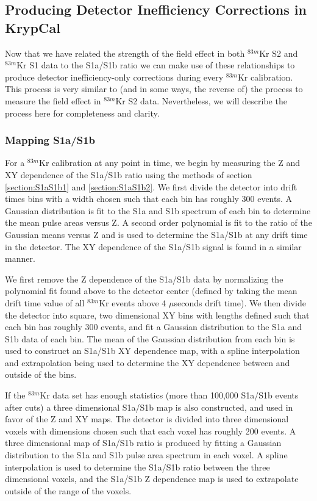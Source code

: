 \subsection{Producing Detector Inefficiency Corrections in KrypCal} \label{KrypCalCode}

Now that we have related the strength of the field effect in both $^{83m}$Kr S2 and $^{83m}$Kr S1 data to the S1a/S1b ratio we can make use of these relationships to produce detector inefficiency-only corrections during every $^{83m}$Kr calibration.  This process is very similar to (and in some ways, the reverse of) the process to measure the field effect in $^{83m}$Kr S2 data. Nevertheless, we will describe the process here for completeness and clarity.

\subsubsection{Mapping S1a/S1b}

For a $^{83m}$Kr calibration at any point in time, we begin by measuring the Z and XY dependence of the S1a/S1b ratio using the methods of section  \ref{section:S1aS1b1} and  \ref{section:S1aS1b2}.  We first divide the detector into drift times bins with a width chosen such that each bin has roughly 300 events.   A Gaussian distribution is fit to the S1a and S1b spectrum of each bin to determine the mean pulse areas versus Z.  A second order polynomial is fit to the ratio of the Gaussian means versus Z and is used to determine the S1a/S1b at any drift time in the detector.  The XY dependence of the S1a/S1b signal is found in a similar manner.  

We first remove the Z dependence of the S1a/S1b data by normalizing the polynomial fit found above to the detector center (defined by taking the mean drift time value of all $^{83m}$Kr events above 4 $\mu$seconds drift time). We then divide the detector into square, two dimensional XY bins with lengths defined such that each bin has roughly 300 events, and fit a Gaussian distribution to the S1a and S1b data of each bin.  The mean of the Gaussian distribution from each bin is used to construct an S1a/S1b XY dependence map, with a spline interpolation and extrapolation being used to determine the XY dependence between and outside of the bins.  

If the $^{83m}$Kr data set has enough statistics (more than 100,000 S1a/S1b events after cuts) a three dimensional S1a/S1b map is also constructed, and used in favor of the Z and XY maps. The detector is divided into three dimensional voxels with dimensions chosen such that each voxel has roughly 200 events.  A three dimensional map of S1a/S1b ratio is produced by fitting a Gaussian distribution to the S1a and S1b pulse area spectrum in each voxel.  A spline interpolation is used to determine the S1a/S1b ratio between the three dimensional voxels, and the S1a/S1b Z dependence map is used to extrapolate outside of the range of the voxels. 

